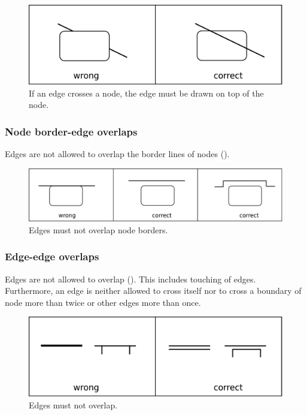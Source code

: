 \begin{figure}[!htb]
  \centering
  \includegraphics[scale=0.3]{images/layout-node-edge}
  \caption{If an edge crosses a node, the edge must be drawn on top of the node.}\label{fig:layout2}
\end{figure}

\subsubsection{Node border-edge overlaps}

Edges are not allowed to overlap the border lines of nodes ().

\begin{figure}[!htb]
  \centering
  \includegraphics[scale=0.3]{images/layout-node-border-edge}
  \caption{Edges must not overlap node borders.}\label{fig:layout3}
\end{figure}

\subsubsection{Edge-edge overlaps}

Edges are not allowed to overlap (). This includes touching of edges. Furthermore, an edge is neither allowed to cross itself nor to cross a boundary of node more than twice or other edges more than once.

\begin{figure}[!htb]
  \centering
  \includegraphics[scale=0.3]{images/layout-edge-edge}
  \caption{Edges must not overlap.}\label{fig:layout4}
\end{figure}

